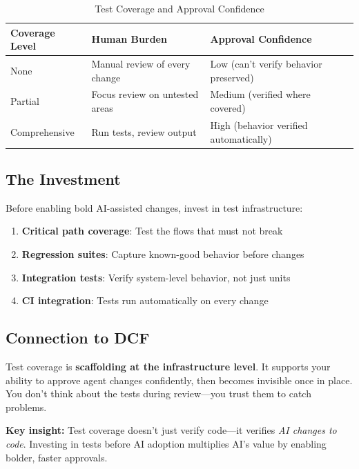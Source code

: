 \begin{table}[H]
\centering
\begin{tabular}{lp{5.5cm}p{5.5cm}}
\toprule
\textbf{Coverage Level} & \textbf{Human Burden} & \textbf{Approval Confidence} \\
\midrule
None & Manual review of every change & Low (can't verify behavior preserved) \\
Partial & Focus review on untested areas & Medium (verified where covered) \\
Comprehensive & Run tests, review output & High (behavior verified automatically) \\
\bottomrule
\end{tabular}
\caption{Test Coverage and Approval Confidence}
\end{table}

\subsection{The Investment}

Before enabling bold AI-assisted changes, invest in test infrastructure:

\begin{enumerate}
    \item \textbf{Critical path coverage}: Test the flows that must not break
    \item \textbf{Regression suites}: Capture known-good behavior before changes
    \item \textbf{Integration tests}: Verify system-level behavior, not just units
    \item \textbf{CI integration}: Tests run automatically on every change
\end{enumerate}

\subsection{Connection to DCF}

Test coverage is \textbf{scaffolding at the infrastructure level}. It supports your ability to approve agent changes confidently, then becomes invisible once in place. You don't think about the tests during review---you trust them to catch problems.

\begin{quotebox}
\textbf{Key insight:} Test coverage doesn't just verify code---it verifies \emph{AI changes to code}. Investing in tests before AI adoption multiplies AI's value by enabling bolder, faster approvals.
\end{quotebox}

